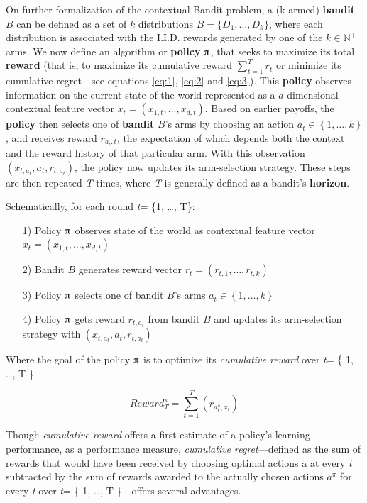 \documentclass[nojss]{jss}\usepackage[]{graphicx}\usepackage[]{color}
\begin{document}
On further formalization of the contextual Bandit problem, a (k-armed) \textbf{bandit} $B$ can be defined as a set of $k$ distributions $B=\{D_{1},\dots ,D_{k}\}$, where each distribution is associated with the I.I.D. rewards generated by one of the $k\in \mathbb {N} ^{+}$ arms. We now define an algorithm or \textbf{policy} $\piup$, that seeks to maximize its total \textbf{reward} (that is, to maximize its cumulative reward $\sum_{t=1}^T r_t$ or minimize its cumulative regret---see equations \ref{eq:1}, \ref{eq:2} and \ref{eq:3}). This \textbf{policy} observes information on the current state of the world represented as a $d$-dimensional contextual feature vector \(x_{t}=\left( x_{1,t},  \dots, x_{d,t}\right)\). Based on earlier payoffs, the \textbf{policy} then selects one of \textbf{bandit} $B$'s arms by choosing an action \(a_{t} \in \left\{ 1, \dots, k \right\}\), and receives reward \(r_{a_{t},t}\), the expectation of which depends both the context and the reward history of that particular arm. With this observation \( (x_{t,a_t},a_{t},r_{t,a_t}) \), the policy now updates its arm-selection strategy. These steps are then repeated \textit{T} times, where \textit{T} is generally defined as a bandit's \textbf{horizon}.

Schematically, for each round \emph{t}= \{1, \ldots, T\}:

\begin{enumerate}
         \item[1)] Policy $\piup$ observes state of the world as contextual feature vector \(x_{t}=\left( x_{1,t},  \dots, x_{d,t}\right)\)
         \item[2)] Bandit $B$ generates reward vector \(r_{t}=\left( r_{t,1},  \dots, r_{t,k}\right)\)
         \item[3)] Policy $\piup$ selects one of bandit $B$'s arms \(a_{t} \in \left\{ 1, \dots, k \right\}\)
         \item[4)] Policy $\piup$ gets reward \(r_{t,a_t}\) from bandit $B$ and updates its arm-selection strategy with \( (x_{t,a_t},a_{t},r_{t,a_t}) \)
\end{enumerate}

Where the goal of the policy $\piup$ is to optimize its \textit{cumulative reward} over \emph{t}= \{ 1, \ldots, T \}

\begin{equation} \label{eq:1}
Reward^{\pi}_{T} = \sum^{T}_{t=1}(r_{a^{\pi}_t,x_t})
\end{equation}

Though \textit{cumulative reward} offers a first estimate of a policy's learning performance, as a performance measure, \textit{cumulative regret}---defined as the sum of rewards that would have been received by choosing optimal actions $\mathrm{a}$ at every \emph{t} subtracted by the sum of rewards awarded to the actually chosen actions $a^{\pi}$ for every \emph{t} over \emph{t}= \{ 1, \ldots, T \}---offers several advantages.
\end{document}
